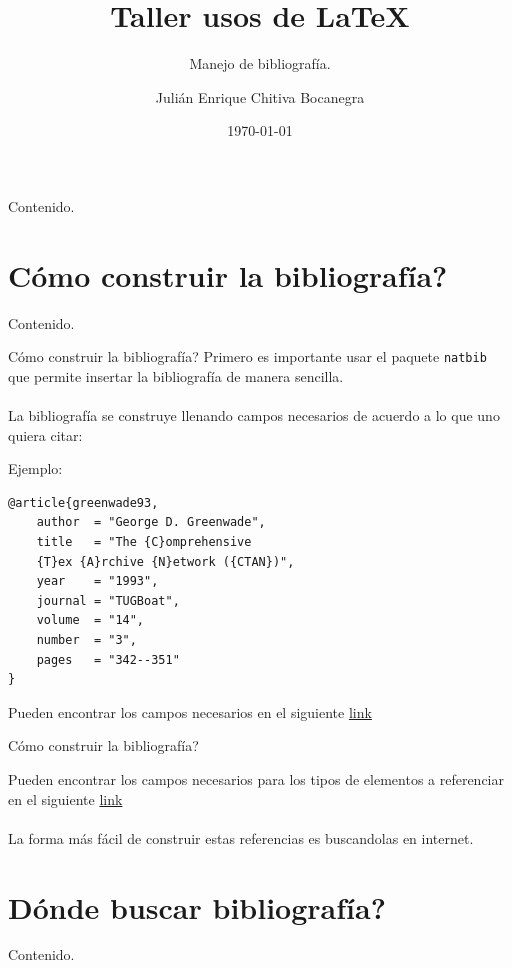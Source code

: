 \documentclass[dvipsnames,xcolor=x11names]{beamer}
\title{Taller usos de \LaTeX}
\subtitle{Manejo de bibliografía.}
\author[Julián Chitiva Bocanegra]{Julián Enrique Chitiva Bocanegra}
\institute[Uniandes] 
{Universidad de los Andes\\ Facultad de Economía}
\date{\today}
\theoremstyle{plain}
\theoremstyle{definition}
\begin{document}
\begin{frame}
  \titlepage
\end{frame}

\begin{frame}{Contenido.}
  \tableofcontents%
\end{frame}
\section{\textquestiondown Cómo construir la bibliografía?}
\begin{frame}{Contenido.}
  \tableofcontents[currentsection]
\end{frame}
\begin{frame}[fragile]{\textquestiondown Cómo construir la bibliografía?}
Primero es importante usar el paquete \verb!natbib! que permite insertar la bibliografía de manera sencilla. \\~\\

La bibliografía se construye llenando campos necesarios de acuerdo a lo que uno quiera citar:

\begin{block}{Ejemplo:}
\begin{verbatim}
@article{greenwade93,
    author  = "George D. Greenwade",
    title   = "The {C}omprehensive
    {T}ex {A}rchive {N}etwork ({CTAN})",
    year    = "1993",
    journal = "TUGBoat",
    volume  = "14",
    number  = "3",
    pages   = "342--351"
}
\end{verbatim}
\end{block}

Pueden encontrar los campos necesarios en el siguiente \href{https://en.wikibooks.org/wiki/LaTeX/Bibliography_Management}{\textcolor{colorClase}{link}}
\end{frame}
\begin{frame}[fragile]{\textquestiondown Cómo construir la bibliografía?}

Pueden encontrar los campos necesarios para los tipos de elementos a referenciar en el siguiente \href{https://en.wikibooks.org/wiki/LaTeX/Bibliography_Management}{\textcolor{colorClase}{link}}\\~\\

La forma más fácil de construir estas referencias es buscandolas en internet.
\end{frame}

\section{\textquestiondown Dónde buscar bibliografía?}
\begin{frame}{Contenido.}
  \tableofcontents[currentsection]
\end{frame}
\end{document}
